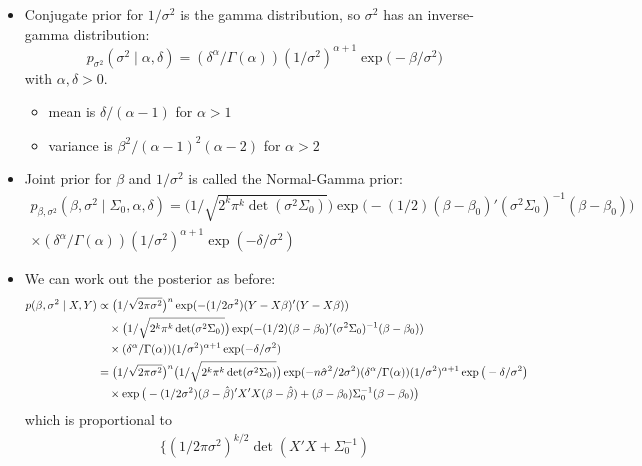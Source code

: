 \begin{itemize}[leftmargin=0pt]
\item Conjugate prior for $1/\sigma^2$ is the gamma distribution, so $\sigma^2$
  has an inverse-gamma distribution:
  \[p_{\sigma^2}(\sigma^2 \mid \alpha, \delta) = (\delta^\alpha/\Gamma(\alpha)) (1/\sigma^2)^{\alpha+1} \exp\big(-\beta/\sigma^2\big)\]
  with $\alpha,\delta > 0$.
\begin{itemize}
\item mean is $\delta / (\alpha - 1)$ for $\alpha > 1$
\item variance is $\beta^2 / (\alpha-1)^2(\alpha-2)$ for $\alpha > 2$
\end{itemize}
\item Joint prior for $\beta$ and $1/\sigma^2$ is called the Normal-Gamma prior:
  \begin{multline*}
    p_{\beta,\sigma^2}(\beta, \sigma^2 \mid \Sigma_0, \alpha, \delta) = \Big(1/\sqrt{2^k \pi^k \det(\sigma^2 \Sigma_0)}\Big)
    \exp\big(- (1/2) (\beta - \beta_0)'(\sigma^2 \Sigma_0)^{-1} (\beta - \beta_0)\big)
    \\ \times (\delta^\alpha/\Gamma(\alpha)) (1/\sigma^2)^{\alpha+1} \exp(-\delta/\sigma^2)
  \end{multline*}
\item We can work out the posterior as before:
  \begin{align*}
    p(\beta, \sigma^2 \mid X, Y) 
    &\propto \big(1/\sqrt{2 \pi \sigma^2}\big)^n
       \exp(-(1/2\sigma^2) (Y - X\beta)'(Y - X\beta)) \\
    &\quad \times \big(1/\sqrt{2^k \pi^k \det(\sigma^2 \Sigma_0)}\big) \exp(-(1/2) (\beta - \beta_0)'(\sigma^2 \Sigma_0)^{-1} (\beta - \beta_0)) \\
    &\quad \times (\delta^\alpha/\Gamma(\alpha)) (1/\sigma^2)^{\alpha+1} \exp(-\delta/\sigma^2) \\
    &= \big(1/\sqrt{2 \pi \sigma^2}\big)^n \big(1/\sqrt{2^k \pi^k \det(\sigma^2 \Sigma_0)}\big)
       \exp(- n \hat{\sigma}^2/2 \sigma^2)
       (\delta^\alpha/\Gamma(\alpha)) (1/\sigma^2)^{\alpha+1} \exp\big(- \delta/\sigma^2\big) \\
    &\quad \times \exp\big(- (1/2\sigma^2) (\beta - \hat{\beta})'X'X(\beta - \hat{\beta}) 
      + (\beta - \beta_0)\Sigma_0^{-1}(\beta - \beta_0)\big)
  \end{align*}
  which is proportional to 
  \begin{multline*}
    \Big\{(1/2\pi\sigma^2)^{k/2} \det(X'X + \Sigma_0^{-1}) \\

\end{multline*}
\end{itemize}
